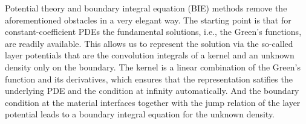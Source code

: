 Potential theory and boundary integral equation (BIE) methods remove the
aforementioned obstacles in a very elegant way. The starting point is
that for constant-coefficient PDEs the fundamental solutions, i.e., the
Green's functions, are readily available. This allows us to represent
the solution via the so-called layer potentials that are the convolution
integrals of a kernel and an unknown density only on the boundary. The
kernel is a linear combination of the Green's function and its
derivatives, which ensures that the representation satifies the
underlying PDE and the condition at infinity automatically. And the
boundary condition at the material interfaces together with the jump
relation of the layer potential leads to a boundary integral equation
for the unknown density.
 

